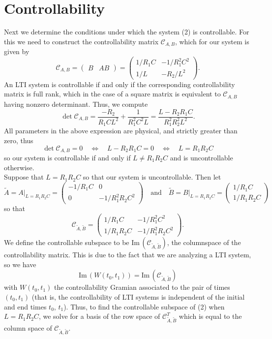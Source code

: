 \documentclass[11pt, letterpaper]{article}
\newcommand{\mc}[1]{\mathcal{#1}} %
\begin{document}
\section*{Controllability} 
Next we determine the conditions under which the system (2) is controllable. For this we need to construct the controllability matrix $\mc{C}_{A,B}$, which for our system is given by
\[\mc{C}_{A,B}=\begin{pmatrix}
    B & AB
\end{pmatrix}=\begin{pmatrix}
    1/R_1C & -1/R_1^2C^2\\
    1/L & -R_2/L^2
\end{pmatrix}.\]
An LTI system is controllable if and only if the corresponding controllability matrix is full rank, which in the case of a square matrix is equivalent to $\mc{C}_{A,B}$ having nonzero determinant. Thus, we compute
\[\det\mc{C}_{A,B}=\frac{-R_2}{R_1CL^2}+\frac{1}{R_1^2C^2L}=\frac{L-R_2R_1C}{R_1^2R_2^2L^2}.\]
All parameters in the above expression are physical, and strictly greater than zero, thus
\[\det\mc{C}_{A,B}=0\quad\Leftrightarrow\quad L-R_2R_1C=0\quad\Leftrightarrow\quad L=R_1R_2C\]
so our system is controllable if and only if $L\neq R_1R_2C$ and is uncontrollable otherwise.\\[10pt]
Suppose that $L=R_1R_2C$ so that our system is uncontrollable. Then let
\[\tilde{A}=A\big|_{L=R_1R_2C}=\begin{pmatrix}
    -1/R_1C & 0\\
    0 & -1/R_1^2R_2C^2
\end{pmatrix}\quad\text{and}\quad \tilde{B}=B\big|_{L=R_1R_2C}=\begin{pmatrix}
    1/R_1C\\
    1/R_1R_2C
\end{pmatrix}\]
so that
\[\mc{C}_{\tilde{A},\tilde{B}}=\begin{pmatrix}
    1/R_1C & -1/R_1^2C^2\\
    1/R_1R_2C & -1/R_1^2R_2C^2
\end{pmatrix}.\]
We define the controllable subspace to be $\text{Im}\,(\mc{C}_{\tilde{A},\tilde{B}})$, the columnspace of the controllability matrix. This is due to the fact that we are analyzing a LTI system, so we have
\[\text{Im}\,(W(t_0,t_1))=\text{Im}\,(\mc{C}_{\tilde{A},\tilde{B}})\]
with $W(t_0,t_1)$ the controllability Gramian associated to the pair of times $(t_0,t_1)$ (that is, the controllability of LTI systems is independent of the initial and end times $t_0$, $t_1$). Thus, to find the controllable subspace of (2) when $L=R_1R_2C$, we solve for a basis of the row space of $\mc{C}^T_{\tilde{A},\tilde{B}}$ which is equal to the column space of $\mc{C}_{\tilde{A},\tilde{B}}$.
\end{document}
